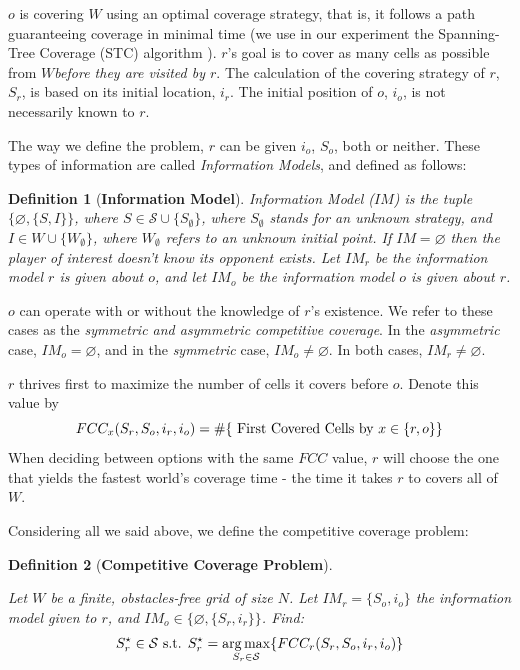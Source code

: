 \documentclass[a4paper,english,10pt]{article}
\newcommand\rob{\ensuremath{r}\xspace}
\newcommand\opp{\ensuremath{o}\xspace}
\newcommand{\w}{\ensuremath{W}\xspace}
\newcommand{\fcc}{\ensuremath{FCC}\xspace}
\DeclareMathOperator*{\argmax}{arg\,max} %
\newtheorem{definition}{Definition}
\begin{document}
\opp is covering \w using an optimal coverage strategy, that is, it follows a path guaranteeing coverage in minimal time (we use in our experiment the Spanning-Tree Coverage (STC) algorithm \cite{gabriely2001spanning}). \rob's goal is to cover as many cells as possible from \w {\em before they are visited by \rob}. The calculation of the covering strategy of \rob, $S_\rob$, is based on its initial location, $i_r$. The initial position of \opp, $i_\opp$, is not necessarily known to \rob.

The way we define the problem, \rob can be given $i_\opp$, $S_\opp$, both or neither. These types of information are called {\em Information Models}, and defined as follows:
\begin{definition}[\textbf{Information Model}]
Information Model ($IM$) is the tuple $\lbrace \varnothing, \lbrace S,I\rbrace \rbrace$, where $S\in \mathcal{S} \cup \lbrace S_\emptyset \rbrace$, where $S_\emptyset$ stands for an unknown strategy, and $I \in W \cup \lbrace \w_\emptyset \rbrace$, where $\w_{\emptyset}$ refers to an unknown initial point. 
If $IM=\varnothing$ then the player of interest doesn't know its opponent exists.
Let $IM_\rob$ be the information model \rob is given about \opp, and let $IM_\opp$ be the information model \opp is given about \rob.
\end{definition}

\opp can operate with or without the knowledge of \rob's existence. We refer to these cases as the {\em symmetric and asymmetric competitive coverage}.
In the {\em asymmetric} case, $IM_\opp=\varnothing$, and in the {\em symmetric} case, $IM_\opp \neq \varnothing$. In both cases, $IM_\rob \neq \varnothing $.

\rob thrives first to maximize the number of cells it covers before \opp. Denote this value by  
\[
\fcc_{x}(S_\rob, S_\opp, i_\rob, i_\opp )=
\# \lbrace \textnormal{ First Covered Cells by } x \in \lbrace\rob,\opp\rbrace \rbrace 
\]
When deciding between options with the same \fcc value, \rob will choose the one that yields the fastest world's coverage time - the time it takes \rob to covers all of \w.

Considering all we said above, we define the competitive coverage problem:

\begin{definition}[\textbf{Competitive Coverage Problem}]
\begin{mdframed}[backgroundcolor=gray!20] 
Let \w be a finite, obstacles-free grid of size $N$. Let $IM_\rob=\lbrace S_\opp ,i_\opp \rbrace$ the information model given to \rob, and $IM_\opp \in \lbrace \varnothing, \lbrace S_\rob, i_\rob \rbrace \rbrace$. Find: \[ S_\rob^\star \in \mathcal{S} \textnormal{ s.t. } S_\rob^\star =\argmax_{S_\rob\in\mathcal{S}} \lbrace \fcc_{r}(S_\rob, S_\opp, i_\rob, i_\opp ) \rbrace\]
\end{mdframed}
\end{definition}
\end{document}

